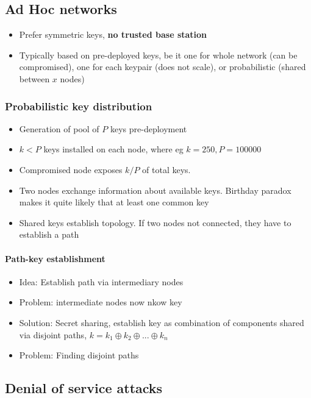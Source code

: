\subsection{Ad Hoc networks}

\begin{itemize}
		\item Prefer symmetric keys, \textbf{no trusted base station}
		\item Typically based on pre-deployed keys, be it one for whole network
				(can be compromised), one for each keypair (does not scale), or
				probabilistic (shared between $x$ nodes)
\end{itemize}

\subsubsection{Probabilistic key distribution}

\begin{itemize}
		\item Generation of pool of $P$ keys pre-deployment
		\item $k < P$ keys installed on each node, where eg $k = 250, P = 100000$
		\item Compromised node exposes $k / P$ of total keys.
		\item Two nodes exchange information about available keys. Birthday paradox makes it quite likely that at least one common key
		\item Shared keys establish topology. If two nodes not connected, they have to establish a path
\end{itemize}

\paragraph{Path-key establishment}

\begin{itemize}
		\item Idea: Establish path via intermediary nodes
		\item Problem: intermediate nodes now nkow key
		\item Solution: Secret sharing, establish key as combination of
				components shared via disjoint paths, $k = k_1 \oplus k_2
				\oplus ... \oplus k_n$
		\item Problem: Finding disjoint paths
\end{itemize}

\subsection{Denial of service attacks}

